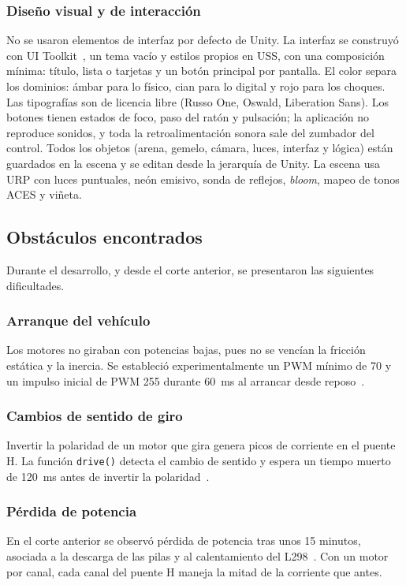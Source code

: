 \documentclass[journal]{IEEEtran}
\begin{document}
\subsubsection{Diseño visual y de interacción}
No se usaron elementos de interfaz por defecto de Unity. La interfaz se construyó con UI Toolkit~\cite{uitk}, un tema vacío y estilos propios en USS, con una composición mínima: título, lista o tarjetas y un botón principal por pantalla. El color separa los dominios: ámbar para lo físico, cian para lo digital y rojo para los choques. Las tipografías son de licencia libre (Russo One, Oswald, Liberation Sans). Los botones tienen estados de foco, paso del ratón y pulsación; la aplicación no reproduce sonidos, y toda la retroalimentación sonora sale del zumbador del control. Todos los objetos (arena, gemelo, cámara, luces, interfaz y lógica) están guardados en la escena y se editan desde la jerarquía de Unity. La escena usa URP con luces puntuales, neón emisivo, sonda de reflejos, \emph{bloom}, mapeo de tonos ACES y viñeta.

\subsection{Obstáculos encontrados}
Durante el desarrollo, y desde el corte anterior, se presentaron las siguientes dificultades.

\subsubsection{Arranque del vehículo}
Los motores no giraban con potencias bajas, pues no se vencían la fricción estática y la inercia. Se estableció experimentalmente un PWM mínimo de 70 y un impulso inicial de PWM 255 durante 60~ms al arrancar desde reposo~\cite{corte2}.

\subsubsection{Cambios de sentido de giro}
Invertir la polaridad de un motor que gira genera picos de corriente en el puente H. La función \texttt{drive()} detecta el cambio de sentido y espera un tiempo muerto de 120~ms antes de invertir la polaridad~\cite{corte2}.

\subsubsection{Pérdida de potencia}
En el corte anterior se observó pérdida de potencia tras unos 15 minutos, asociada a la descarga de las pilas y al calentamiento del L298~\cite{corte2}. Con un motor por canal, cada canal del puente H maneja la mitad de la corriente que antes.
\end{document}
